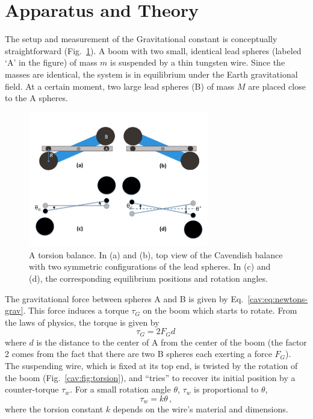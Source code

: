 \section{Apparatus and Theory}\label{cav:sec:apparatus}

The setup and measurement of the Gravitational constant is conceptually straightforward (Fig.~\ref{cav:fig:setup-booms}). A boom
with two small, identical lead spheres (labeled `A' in the figure) of mass $m$ is suspended by a thin tungsten
wire. Since the masses are identical, the system is in equilibrium under the Earth
gravitational field. At a certain moment, two large lead spheres (B) of mass $M$ are placed
close to the A spheres.

\begin{figure}
	\centering
	\includegraphics[width=0.7\textwidth]{cavendish/tel-rp2111-booms}
	\caption{A torsion balance. In (a) and (b), top view of the Cavendish balance with two
		symmetric configurations of the lead spheres. In (c) and (d), the corresponding
		equilibrium positions and rotation angles.}\label{cav:fig:setup-booms}
\end{figure}

The gravitational force between spheres A and B is given by Eq.~\ref{cav:eq:newtons-grav}. This force induces a torque $\tau_G$ on the boom which starts to rotate. From the laws of
physics, the torque is given by
\begin{equation}
 \tau_G = 2 F_G d \,
\end{equation}
where $d$ is the distance to the center of A from the center of the boom (the factor 2 comes
from the fact that there are two B spheres each exerting a force $F_G$). The suspending
wire, which is fixed at its top end, is twisted by the rotation of the boom (Fig.~\ref{cav:fig:torsion}), and
``tries'' to recover its initial position by a counter-torque $\tau_w$. For a small rotation angle $\theta$,
$\tau_w$ is proportional to $\theta$,
\begin{equation}
 \tau_w = k \theta\,,
\end{equation}
where the torsion constant $k$ depends on the wire's material and dimensions.


